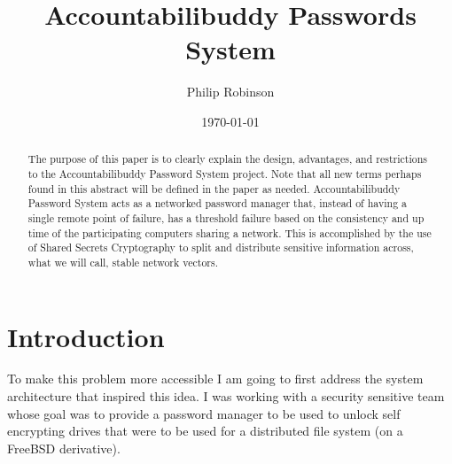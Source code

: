 \documentclass[11pt]{article} %
\title{Accountabilibuddy Passwords System}
\date{\today}
\author{Philip Robinson}
\def\aps{Accountabilibuddy Password System\xspace}
\def\ssc{Shared Secrets Cryptography\xspace}
\def\tf{threshold failure\xspace}
\def\snv{stable network vectors\xspace}
\def\pm{password manager\xspace}
\def\npm{networked \pm}
\def\sed{self encrypting drive\xspace}
\def\seds{\sed{s}\xspace}
\def\bsd{FreeBSD\xspace}
\begin{document}
\maketitle

\begin{abstract}
The purpose of this paper is to clearly explain the design, advantages, and restrictions to the \aps project. Note that all new terms perhaps found in this abstract will be defined in the paper as needed. \aps acts as a \npm that, instead of having a single remote point of failure, has a \tf based on the consistency and up time of the participating computers sharing a network. This is accomplished by the use of \ssc to split and distribute sensitive information across, what we will call, \snv.

\end{abstract}

\section*{Introduction}
To make this problem more accessible I am going to first address the system architecture that inspired this idea. I was working with a security sensitive team whose goal was to provide a \pm to be used to unlock \seds that were to be used for a distributed file system (on a \bsd derivative). 
\end{document}
